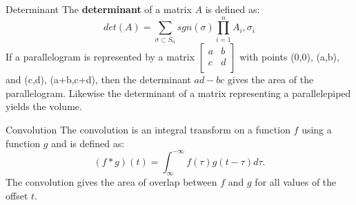 \documentclass[xcolor=dvipsnames]{beamer}
\begin{document}

\begin{frame}[label=math-determinant]{Determinant}
The \textbf{determinant} of a matrix $A$ is defined as:
 \begin{equation}
  det(A) = \sum_{\sigma \subset S_n} sgn(\sigma)
           \prod_{i=1}^{n} A_i,\sigma_i
 \end{equation}
If a parallelogram is represented by a matrix 
$
 \begin{bmatrix}
   a &
   b \\
   c &
   d \\
 \end{bmatrix}
$
with points (0,0), (a,b), and (c,d), (a+b,c+d), then the determinant $ad-bc$ gives the area of the parallelogram. Likewise the determinant of a matrix representing a parallelepiped yields the volume. 
\end{frame}

\begin{frame}[label=math-convolution]{Convolution}
 The convolution is an integral transform on a function $f$ using a function $g$ and is defined as:
 \begin{equation}
  (f*g)(t) = \int_{\infty}^{-\infty} f(\tau) g(t-\tau) d\tau.
 \end{equation}
 The convolution gives the area of overlap between $f$ and $g$ for all values of the offset $t$.
\end{frame}
\end{document}
